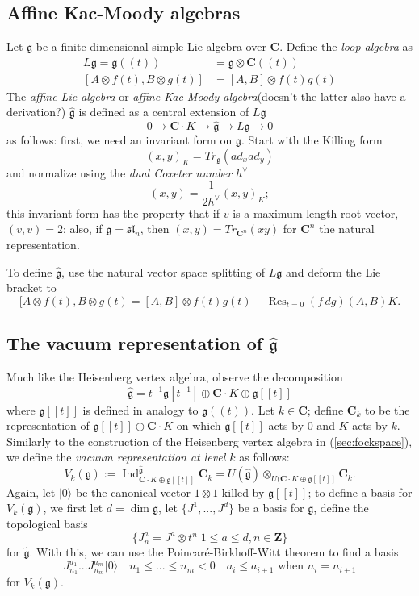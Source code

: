 \documentclass{article}
\newcommand{\CC}{\mathbold{C}}
\newcommand{\ZZ}{\mathbold{Z}}
\newcommand{\vac}{|0\rangle}
\newcommand{\gf}{\mathfrak{g}}
\newcommand{\ghat}{\widehat{\mathfrak{g}}}
\DeclareMathOperator{\Res}{Res}
\DeclareMathOperator{\Ind}{Ind}
\begin{document}
\subsection{Affine Kac-Moody algebras}
Let $\gf$ be a finite-dimensional simple Lie algebra over $\CC$.  Define the \textit{loop algebra} as
\begin{align*}
  L\gf=\gf((t))&=\gf \otimes \CC((t))\\
  [A \otimes f(t),B \otimes g(t)]&=[A,B] \otimes f(t)g(t)
\end{align*}
The \textit{affine Lie algebra} or \textit{affine Kac-Moody algebra}(doesn't the latter also have a derivation?) $\ghat$ is defined as a central extension of $L\gf$
\[0 \rightarrow \CC \cdot K \rightarrow \ghat \rightarrow L\gf \rightarrow 0 \]
as follows: first, we need an invariant form on $\gf$.  Start with the Killing form
\[(x,y)_K=Tr_\gf(ad_xad_y) \]
and normalize using the \textit{dual Coxeter number} $h^\vee$
\[(x,y)=\frac{1}{2h^\vee}(x,y)_K; \]
this invariant form has the property that if $v$ is a maximum-length root vector, $(v,v)=2$; also, if $\gf=\mathfrak{sl}_n$, then $(x,y)=Tr_{\CC^n}(xy)$ for $\CC^n$ the natural representation.

To define $\ghat$, use the natural vector space splitting of $L\gf$ and deform the Lie bracket to
\[[A \otimes f(t),B \otimes g(t) = [A,B] \otimes f(t)g(t) - \Res_{t=0}(f\,dg) (A,B)K. \]

\subsection{The vacuum representation of $\ghat$}
Much like the Heisenberg vertex algebra, observe the decomposition
\[\ghat = t^{-1}\gf[t^{-1}] \oplus \CC \cdot K \oplus \gf[[t]] \]
where $\gf[[t]]$ is defined in analogy to $\gf((t))$.  Let $k \in \CC$; define $\CC_k$ to be the representation of $\gf[[t]] \oplus \CC \cdot K$ on which $\gf[[t]]$ acts by $0$ and $K$ acts by $k$.  Similarly to the construction of the Heisenberg vertex algebra in (\ref{sec:fockspace}), we define the \textit{vacuum representation at level $k$} as follows:
\[V_k(\gf):=\Ind_{\CC \cdot K \oplus \gf[[t]]}^{\ghat}\CC_k = U(\ghat) \otimes_{U(\CC \cdot K \oplus \gf[[t]]}\CC_k. \]
Again, let $\vac$ be the canonical vector $1 \otimes 1$ killed by $\gf[[t]]$; to define a basis for $V_k(\gf)$, we first let $d=\dim \gf$, let $\{J^1,...,J^d\}$ be a basis for $\gf$, define the topological basis
\[\{J^a_n=J^a \otimes t^n|1 \le a \le d, n \in \ZZ \} \]
for $\ghat$.  With this, we can use the Poincaré-Birkhoff-Witt theorem to find a basis
\[J^{a_1}_{n_1}...J^{a_m}_{n_m}\vac \quad n_1 \le ... \le n_m < 0 \quad a_i \le a_{i+1} \textrm{ when }n_i=n_{i+1} \]
for $V_k(\gf)$.
\end{document}
